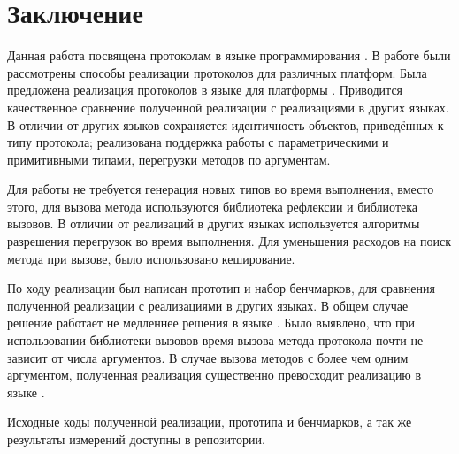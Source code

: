 \section*{Заключение}
Данная работа посвящена протоколам в языке программирования . В работе были рассмотрены способы реализации протоколов для различных платформ. Была предложена реализация протоколов в языке  для платформы . Приводится качественное сравнение полученной реализации с реализациями в других языках. В отличии от других языков сохраняется идентичность объектов, приведённых к типу протокола; реализована поддержка работы с параметрическими и примитивными типами, перегрузки методов по аргументам.

Для работы не требуется генерация новых типов во время выполнения, вместо этого, для вызова метода используются библиотека рефлексии и библиотека вызовов. В отличии от реализаций в других языках используется алгоритмы разрешения перегрузок во время выполнения. Для уменьшения расходов на поиск метода при вызове, было использовано кеширование.

По ходу реализации был написан прототип и набор бенчмарков, для сравнения полученной реализации с реализациями в других языках. В общем случае решение работает не медленнее решения в языке . Было выявлено, что при использовании библиотеки вызовов время вызова метода протокола почти не зависит от числа аргументов. В случае вызова методов с более чем одним аргументом, полученная реализация существенно превосходит реализацию в языке .

Исходные коды полученной реализации, прототипа и бенчмарков, а так же результаты измерений доступны в репозитории\cite{repo}.
